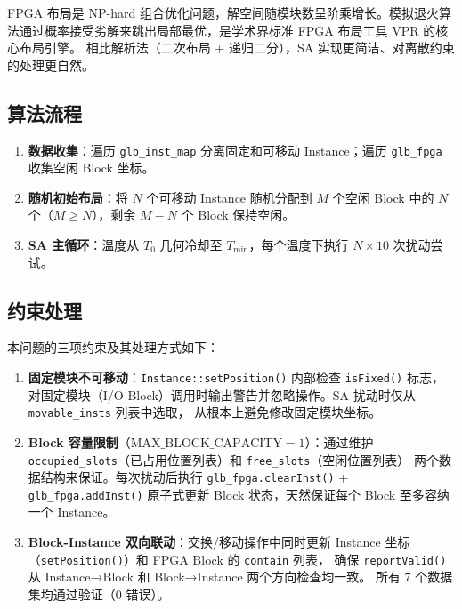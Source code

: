 \documentclass[12pt,a4paper]{ctexart}
\begin{document}
FPGA 布局是 NP-hard 组合优化问题，解空间随模块数呈阶乘增长。模拟退火算法通过概率接受劣解来跳出局部最优，是学术界标准 FPGA 布局工具 VPR 的核心布局引擎。
相比解析法（二次布局 + 递归二分），SA 实现更简洁、对离散约束的处理更自然。

\subsection{算法流程}

\begin{enumerate}[label=\textbf{步骤 \arabic*:}, leftmargin=*]
    \item \textbf{数据收集}：遍历 \texttt{glb\_inst\_map} 分离固定和可移动 Instance；遍历 \texttt{glb\_fpga} 收集空闲 Block 坐标。
    \item \textbf{随机初始布局}：将 $N$ 个可移动 Instance 随机分配到 $M$ 个空闲 Block 中的 $N$ 个（$M \ge N$），剩余 $M-N$ 个 Block 保持空闲。
    \item \textbf{SA 主循环}：温度从 $T_0$ 几何冷却至 $T_{\min}$，每个温度下执行 $N \times 10$ 次扰动尝试。
\end{enumerate}

\subsection{约束处理}

本问题的三项约束及其处理方式如下：

\begin{enumerate}[label=(\arabic*), leftmargin=*]
    \item \textbf{固定模块不可移动}：\texttt{Instance::setPosition()} 内部检查 \texttt{isFixed()} 标志，
          对固定模块（I/O Block）调用时输出警告并忽略操作。SA 扰动时仅从 \texttt{movable\_insts} 列表中选取，
          从根本上避免修改固定模块坐标。

    \item \textbf{Block 容量限制}（$\text{MAX\_BLOCK\_CAPACITY}=1$）：通过维护
          \texttt{occupied\_slots}（已占用位置列表）和 \texttt{free\_slots}（空闲位置列表）
          两个数据结构来保证。每次扰动后执行 \texttt{glb\_fpga.clearInst()} +
          \texttt{glb\_fpga.addInst()} 原子式更新 Block 状态，天然保证每个 Block 至多容纳一个 Instance。

    \item \textbf{Block-Instance 双向联动}：交换/移动操作中同时更新 Instance 坐标
          （\texttt{setPosition()}）和 FPGA Block 的 \texttt{contain} 列表，
          确保 \texttt{reportValid()} 从 Instance→Block 和 Block→Instance 两个方向检查均一致。
          所有 7 个数据集均通过验证（0 错误）。
\end{enumerate}
\end{document}
